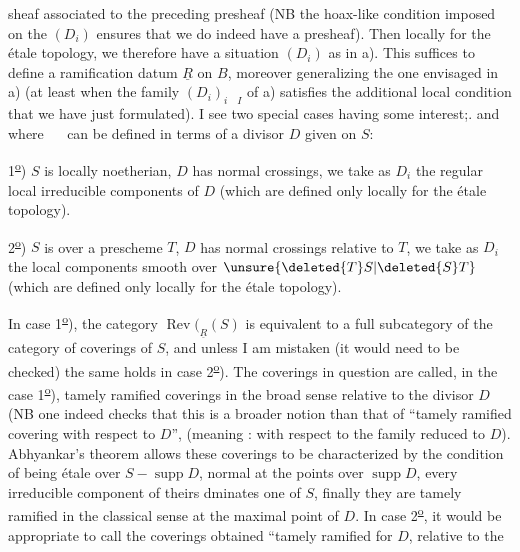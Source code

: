 sheaf associated to the preceding presheaf (NB the hoax-like condition imposed on the $(D_i)$ ensures that we do indeed have a presheaf). Then locally for the étale topology, we therefore have a situation $(D_i)$ as in a). This suffices to define a ramification datum $\underline{R}$ on $B$, moreover generalizing the one envisaged in a) (at least when the family $(D_i)_{i\quad I}$ of a) satisfies the additional local condition that we have just formulated). I see two special cases having some interest;.  and  where $\quad$ can be defined in terms of a divisor $D$ given on $S$:

1\textsuperscript{\uline{o}}) $S$ is locally noetherian, $D$ has normal crossings, we take as $D_i$ the regular local irreducible components of $D$ (which are defined only locally for the étale topology).

2\textsuperscript{\uline{o}}) $S$ is over a prescheme $T$, $D$ has normal crossings relative to $T$, we take as $D_i$ the local components smooth over $\unsure{\deleted{T}S|\deleted{S}T}$ (which are defined only locally for the étale topology).

In case 1\textsuperscript{\uline{o}}), the category $\operatorname{Rev}(_{\underline{R}}(S)$ is equivalent to a full subcategory of the category of coverings of $S$, and unless I am mistaken (it would need to be checked) the same holds in case 2\textsuperscript{\uline{o}}). The coverings in question are called, in the case 1\textsuperscript{\uline{o}}), tamely ramified coverings in the broad sense relative to the divisor $D$ (NB one indeed checks that this is a broader notion than that of ``tamely ramified covering with respect to $D$'', (meaning : with respect to the family reduced to $D$). Abhyankar's theorem allows these coverings to be characterized by the condition of being étale over  $S-\operatorname{supp}D$, normal at the points over $\operatorname{supp}D$, every irreducible component of theirs dminates one of $S$, finally they are tamely ramified in the classical sense at the maximal point of $D$. In case 2\textsuperscript{\uline{o}}, it would be appropriate to call the coverings obtained ``tamely ramified for $D$, relative to the
